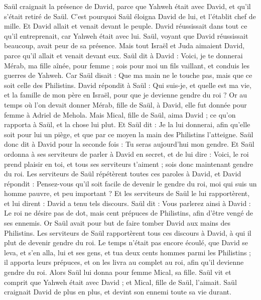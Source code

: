 \begin{multicols}{2}
Saül craignait la présence de David, parce que Yahweh était avec David, et qu'il s'était retiré de Saül.
C'est pourquoi Saül éloigna David de lui, et l'établit chef de mille. Et David allait et venait devant le peuple.
David réussissait dans tout ce qu'il entreprenait, car Yahweh était avec lui.
Saül, voyant que David réussissait beaucoup, avait peur de sa présence.
Mais tout Israël et Juda aimaient David, parce qu'il allait et venait devant eux.
Saül dit à David : Voici, je te donnerai Mérab, ma fille aînée, pour femme ; sois pour moi un fils vaillant, et conduis les guerres de Yahweh. Car Saül disait : Que ma main ne le touche pas, mais que ce soit celle des Philistins.
David répondit à Saül : Qui suis-je, et quelle est ma vie, et la famille de mon père en Israël, pour que je devienne gendre du roi ?
Or au temps où l'on devait donner Mérab, fille de Saül, à David, elle fut donnée pour femme à Adriel de Mehola.
Mais Mical, fille de Saül, aima David ; ce qu'on rapporta à Saül, et la chose lui plut.
Et Saül dit : Je la lui donnerai, afin qu'elle soit pour lui un piège, et que par ce moyen la main des Philistins l'atteigne. Saül donc dit à David pour la seconde fois : Tu seras aujourd'hui mon gendre.
Et Saül ordonna à ses serviteurs de parler à David en secret, et de lui dire : Voici, le roi prend plaisir en toi, et tous ses serviteurs t'aiment ; sois donc maintenant gendre du roi.
Les serviteurs de Saül répétèrent toutes ces paroles à David, et David répondit : Pensez-vous qu'il soit facile de devenir le gendre du roi, moi qui suis un homme pauvre, et peu important ?
Et les serviteurs de Saül le lui rapportèrent, et lui dirent : David a tenu tels discours.
Saül dit : Vous parlerez ainsi à David : Le roi ne désire pas de dot, mais cent prépuces de Philistins, afin d'être vengé de ses ennemis. Or Saül avait pour but de faire tomber David aux mains des Philistins.
Les serviteurs de Saül rapportèrent tous ces discours à David, à qui il plut de devenir gendre du roi. Le temps n'était pas encore écoulé,
que David se leva, et s'en alla, lui et ses gens, et tua deux cents hommes parmi les Philistins ; il apporta leurs prépuces, et on les livra au complet au roi, afin qu'il devienne gendre du roi. Alors Saül lui donna pour femme Mical, sa fille.
Saül vit et comprit que Yahweh était avec David ; et Mical, fille de Saül, l'aimait.
Saül craignait David de plus en plus, et devint son ennemi toute sa vie durant.

\end{multicols}
